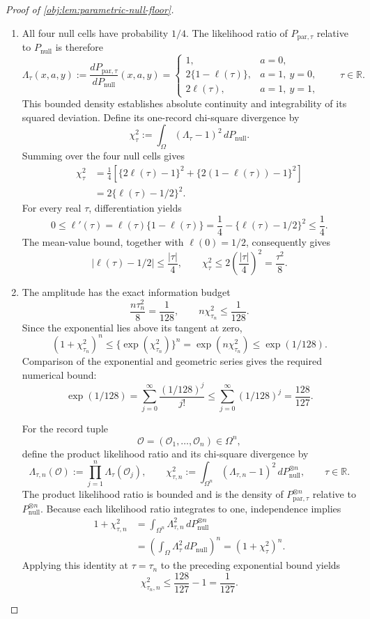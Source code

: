 \documentclass[11pt]{article}
\begin{document}
\begin{proof}[Proof of \cref{obj:lem:parametric-null-floor}]
\begin{enumerate}
\item All four null cells have probability \(1/4\). The likelihood ratio of \(P_{\mathrm{par},\tau}\) relative to \(P_{\mathrm{null}}\) is therefore
\[
\Lambda_\tau(x,a,y)
:=
\frac{dP_{\mathrm{par},\tau}}{dP_{\mathrm{null}}}(x,a,y)
=
\begin{cases}
1,&a=0,\\
2\{1-\ell(\tau)\},&a=1,\ y=0,\\
2\ell(\tau),&a=1,\ y=1,
\end{cases}
\qquad \tau\in\mathbb R.
\]
This bounded density establishes absolute continuity and integrability of its squared deviation. Define its one-record chi-square divergence by
\[
\chi^2_\tau
:=
\int_\Omega(\Lambda_\tau-1)^2\,dP_{\mathrm{null}}.
\]
Summing over the four null cells gives
\[
\begin{aligned}
\chi^2_\tau
&=
\frac14\left[
\{2\ell(\tau)-1\}^2+
\{2(1-\ell(\tau))-1\}^2
\right]\\
&=2\{\ell(\tau)-1/2\}^2.
\end{aligned}
\]
For every real \(\tau\), differentiation yields
\[
0\le\ell'(\tau)
=\ell(\tau)\{1-\ell(\tau)\}
=\frac14-\{\ell(\tau)-1/2\}^2
\le\frac14.
\]
The mean-value bound, together with \(\ell(0)=1/2\), consequently gives
\[
|\ell(\tau)-1/2|\le\frac{|\tau|}{4},
\qquad
\chi^2_\tau
\le2\left(\frac{|\tau|}{4}\right)^2
=\frac{\tau^2}{8}.
\]

\item The amplitude has the exact information budget
\[
\frac{n\tau_n^2}{8}=\frac1{128},
\qquad
n\chi^2_{\tau_n}\le\frac1{128}.
\]
Since the exponential lies above its tangent at zero,
\[
(1+\chi^2_{\tau_n})^n
\le
\{\exp(\chi^2_{\tau_n})\}^n
=
\exp(n\chi^2_{\tau_n})
\le
\exp(1/128).
\]
Comparison of the exponential and geometric series gives the required numerical bound:
\[
\exp(1/128)
=
\sum_{j=0}^{\infty}\frac{(1/128)^j}{j!}
\le
\sum_{j=0}^{\infty}(1/128)^j
=
\frac{128}{127}.
\]

For the record tuple
\[
\mathcal O=(\mathcal O_1,\ldots,\mathcal O_n)\in\Omega^n,
\]
define the product likelihood ratio and its chi-square divergence by
\[
\Lambda_{\tau,n}(\mathcal O)
:=
\prod_{j=1}^n\Lambda_\tau(\mathcal O_j),
\qquad
\chi^2_{\tau,n}
:=
\int_{\Omega^n}(\Lambda_{\tau,n}-1)^2
\,dP_{\mathrm{null}}^{\otimes n},
\qquad \tau\in\mathbb R.
\]
The product likelihood ratio is bounded and is the density of
\(P_{\mathrm{par},\tau}^{\otimes n}\) relative to
\(P_{\mathrm{null}}^{\otimes n}\). Because each likelihood ratio integrates to one, independence implies
\[
\begin{aligned}
1+\chi^2_{\tau,n}
&=
\int_{\Omega^n}\Lambda_{\tau,n}^2
\,dP_{\mathrm{null}}^{\otimes n}\\
&=
\left(\int_\Omega\Lambda_\tau^2\,dP_{\mathrm{null}}\right)^n
=
(1+\chi^2_\tau)^n.
\end{aligned}
\]
Applying this identity at \(\tau=\tau_n\) to the preceding exponential bound yields
\[
\chi^2_{\tau_n,n}
\le\frac{128}{127}-1
=\frac1{127}.
\]


\end{enumerate}
\end{proof}
\end{document}

